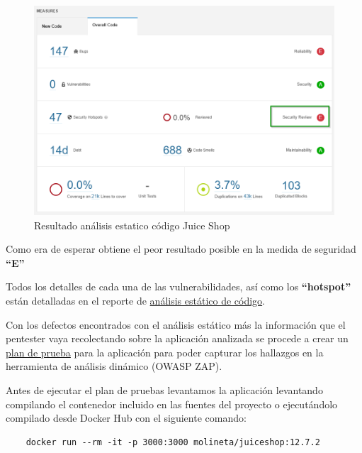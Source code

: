 \begin{figure}[!htb]
    \centering  
    \captionsetup{width=1\linewidth}  
    \includegraphics[width=\linewidth]{./imagenes/08_AnalisisEstatico_JuiceShop.png}
    \caption{Resultado análisis estatico código Juice Shop}  
    \label{fig:23}
\end{figure}

Como era de esperar obtiene el peor resultado posible en la medida de seguridad \textbf{“E”}

Todos los detalles de cada una de las vulnerabilidades, así como los \textbf{“hotspot”} están detalladas en el reporte de 
\href{https://github.com/M0l1n3ta/PFG/blob/master/Reportes/An%C3%A1lisis estatico de c%C3%B3digo/ReporteAnalisisestatico_JuiceShop.docx}{análisis estático de código}.

Con los defectos encontrados con el análisis estático más la información que el pentester vaya recolectando sobre la aplicación 
analizada se procede a crear un \href{https://github.com/M0l1n3ta/PFG/blob/master/Scripts/Plan Pruebas/PlanPruebas_OWASP_JuiceShop.ps1}{plan de prueba} 
para la aplicación para poder capturar los hallazgos en la herramienta de análisis dinámico (OWASP ZAP).

\newpage

Antes de ejecutar el plan de pruebas levantamos la aplicación levantando compilando el contenedor incluido en las fuentes 
del proyecto o ejecutándolo compilado desde Docker Hub con el siguiente comando:

\begin{verbatim}
    docker run --rm -it -p 3000:3000 molineta/juiceshop:12.7.2
\end{verbatim}

